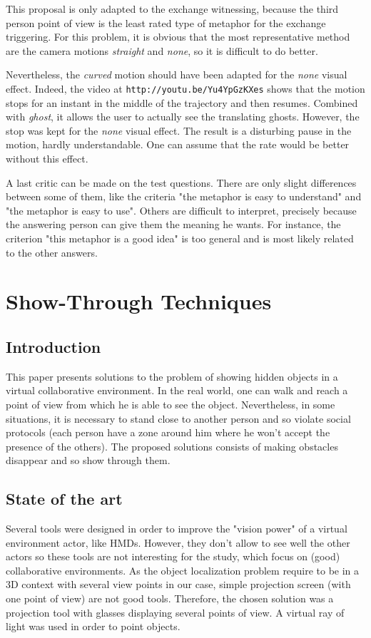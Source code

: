 \documentclass[a4paper]{article}
\begin{document}
This proposal is only adapted to the exchange witnessing, because the third person point of view is the least rated type of metaphor for the exchange triggering. For this problem, it is obvious that the most representative method are the camera motions \textit{straight} and \textit{none}, so it is difficult to do better.

Nevertheless, the \textit{curved} motion should have been adapted for the \textit{none} visual effect. Indeed, the video at \texttt{http://youtu.be/Yu4YpGzKXes} shows that the motion stops for an instant in the middle of the trajectory and then resumes. Combined with \textit{ghost}, it allows the user to actually see the translating ghosts. However, the stop was kept for the \textit{none} visual effect. The result is a disturbing pause in the motion, hardly understandable. One can assume that the rate would be better without this effect.

A last critic can be made on the test questions. There are only slight differences between some of them, like the criteria "the metaphor is easy to understand" and "the metaphor is easy to use". Others are difficult to interpret, precisely because the answering person can give them the meaning he wants. For instance, the criterion "this metaphor is a good idea" is too general and is most likely related to the other answers.

\section{Show-Through Techniques}

\subsection{Introduction}
This paper presents solutions to the problem of showing hidden objects in a virtual collaborative environment. In the real world, one can walk and reach a point of view from which he is able to see the object. Nevertheless, in some situations, it is necessary to stand close to another person and so violate social protocols (each person have a zone around him where he won't accept the presence of the others). The proposed solutions consists of making obstacles disappear and so show through them.

\subsection{State of the art}
Several tools were designed in order to improve the "vision power" of a virtual environment actor, like HMDs. However, they don't allow to see well the other actors so these tools are not interesting for the study, which focus on (good) collaborative environments. As the object localization problem require to be in a 3D context with several view points in our case, simple projection screen (with one point of view) are not good tools. Therefore, the chosen solution was a projection tool with glasses displaying several points of view. A virtual ray of light was used in order to point objects.
\end{document}
